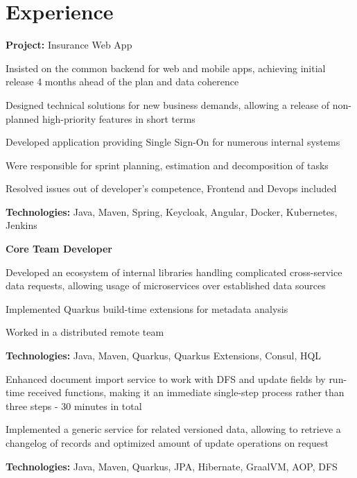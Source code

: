 \documentclass[]{resume}
\begin{document}
\begin{minipage}[t]{0.66\textwidth} 


\section{Experience}
{\bf Project:} Insurance Web App
\vspace{\topsep} %
\begin{tightemize}
\item Insisted on the common backend for web and mobile apps, achieving initial release 4 months ahead of the plan and data coherence
\item Designed technical solutions for new business demands, allowing a release of non-planned high-priority features in short terms
\item Developed application providing Single Sign-On for numerous internal systems
\item Were responsible for sprint planning, estimation and decomposition of tasks
\item Resolved issues out of developer's competence, Frontend and Devops included
\end{tightemize}
{\bf Technologies:} Java, Maven, Spring, Keycloak, Angular, Docker, Kubernetes, Jenkins
\sectionsep

{\bf Core Team Developer}
\begin{tightemize}
\item Developed an ecosystem of internal libraries handling complicated cross-service data requests, allowing usage of microservices over established data sources
\item Implemented Quarkus build-time extensions for metadata analysis
\item Worked in a distributed remote team
\end{tightemize}
{\bf Technologies:} Java, Maven, Quarkus, Quarkus Extensions, Consul, HQL
\sectionsep

\begin{tightemize}
\item Enhanced document import service to work with DFS and update fields by run-time received functions, making it an immediate single-step process rather than three steps - 30 minutes in total
\item Implemented a generic service for related versioned data, allowing to retrieve a changelog of records and optimized amount of update operations on request
\end{tightemize}
{\bf Technologies:} Java, Maven, Quarkus, JPA, Hibernate, GraalVM, AOP, DFS
\sectionsep


\end{minipage}
\end{document}
